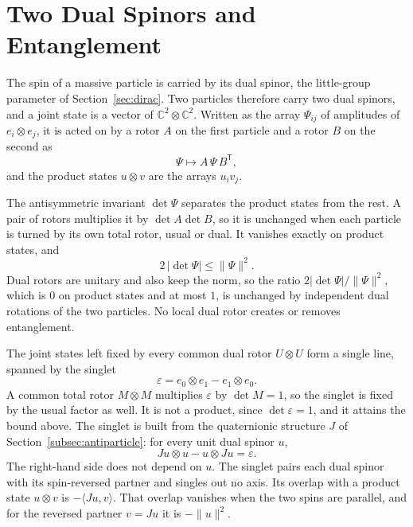 \documentclass[a4paper]{article}
\begin{document}
\section{Two Dual Spinors and Entanglement}
\label{sec:entanglement}

The spin of a massive particle is carried by its dual spinor, the little-group parameter of Section~\ref{sec:dirac}. Two particles therefore carry two dual spinors, and a joint state is a vector of $\mathbb{C}^2\otimes\mathbb{C}^2$. Written as the array $\Psi_{ij}$ of amplitudes of $e_i\otimes e_j$, it is acted on by a rotor $A$ on the first particle and a rotor $B$ on the second as
\[
\Psi\mapsto A\,\Psi\,B^{\mathsf T},
\]
and the product states $u\otimes v$ are the arrays $u_iv_j$.

The antisymmetric invariant $\det\Psi$ separates the product states from the rest. A pair of rotors multiplies it by $\det A\det B$, so it is unchanged when each particle is turned by its own total rotor, usual or dual. It vanishes exactly on product states, and
\[
2\,|\det\Psi|\le\lVert\Psi\rVert^2 .
\]
Dual rotors are unitary and also keep the norm, so the ratio $2|\det\Psi|/\lVert\Psi\rVert^2$, which is $0$ on product states and at most $1$, is unchanged by independent dual rotations of the two particles. No local dual rotor creates or removes entanglement.

The joint states left fixed by every common dual rotor $U\otimes U$ form a single line, spanned by the singlet
\[
\varepsilon=e_0\otimes e_1-e_1\otimes e_0 .
\]
A common total rotor $M\otimes M$ multiplies $\varepsilon$ by $\det M=1$, so the singlet is fixed by the usual factor as well. It is not a product, since $\det\varepsilon=1$, and it attains the bound above. The singlet is built from the quaternionic structure $J$ of Section~\ref{subsec:antiparticle}: for every unit dual spinor $u$,
\[
Ju\otimes u-u\otimes Ju=\varepsilon .
\]
The right-hand side does not depend on $u$. The singlet pairs each dual spinor with its spin-reversed partner and singles out no axis. Its overlap with a product state $u\otimes v$ is $-\langle Ju,v\rangle$. That overlap vanishes when the two spins are parallel, and for the reversed partner $v=Ju$ it is $-\lVert u\rVert^2$.
\end{document}
